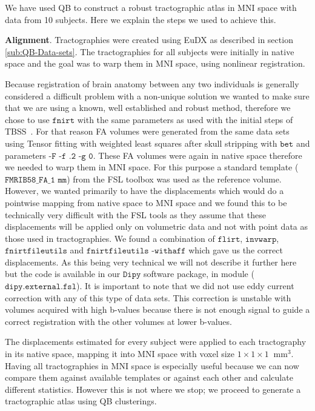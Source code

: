 \documentclass[journal]{IEEEtran}
\begin{document}
We have used QB to construct a robust tractographic atlas in MNI space
with data from 10 subjects. Here we explain the steps we used to achieve
this.

\textbf{Alignment}. Tractographies were created using EuDX as described
in section \ref{sub:QB-Data-sets}. The tractographies for all subjects
were initially in native space and the goal was to warp them in MNI
space, using nonlinear registration.

Because registration of brain anatomy between any two individuals is generally
considered a difficult problem with a non-unique solution we wanted to make sure
that we are using a known, well established and robust method, therefore we
chose to use $\texttt{fnirt}$ with the same parameters as used with the initial
steps of TBSS~\cite{Smith2006NeuroImage}. For that reason FA volumes were
generated from the same data sets using Tensor fitting with weighted least
squares after skull stripping with $\texttt{bet}$ and parameters $\texttt{-F -f
.2 -g 0}$. These FA volumes were again in native space therefore we needed to
warp them in MNI space. For this purpose a standard template
($\texttt{FMRIB58\_FA\_1~mm}$) from the FSL toolbox was used as the reference
volume. However, we wanted primarily to have the displacements which would do a
pointwise mapping from native space to MNI space and we found this to be
technically very difficult with the FSL tools as they assume that these
displacements will be applied only on volumetric data and not with point data as
those used in tractographies. We found a combination of $\texttt{flirt}$,
$\texttt{invwarp}$, $\texttt{fnirtfileutils}$ and $\texttt{fnirtfileutils
-withaff}$ which gave us the correct displacements. As this being very technical
we will not describe it further here but the code is available in our
$\texttt{Dipy}$ software package, in module ($\texttt{dipy.external.fsl}$). It
is important to note that we did not use eddy current correction with any of
this type of data sets. This correction is unstable with volumes acquired with
high b-values because there is not enough signal to guide a correct registration
with the other volumes at lower b-values.

The displacements estimated for every subject were applied
to each tractography in its native space, mapping it into MNI
space with voxel size $1\times1\times1~\textrm{~mm}^{3}$. Having all
tractographies in MNI space is especially useful because we can now
compare them against available templates or against each other and
calculate different statistics. However this is not where we stop; we
proceed to generate a tractographic atlas using QB clusterings.
\end{document}
